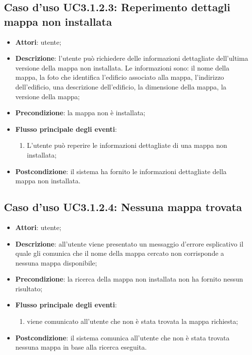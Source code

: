 \documentclass[../AnalisiDeiRequisiti.tex]{subfiles}
\begin{document}
\subsection{Caso d'uso UC3.1.2.3: Reperimento dettagli mappa non installata}
\begin{itemize}
	\item \textbf{Attori}: utente;
	\item \textbf{Descrizione}: l'utente può richiedere delle informazioni dettagliate dell'ultima versione della mappa non installata. Le informazioni sono: il nome della mappa, la foto che identifica l'edificio associato alla mappa, l'indirizzo dell'edificio, una descrizione dell'edificio, la dimensione della mappa, la versione della mappa; 
	\item \textbf{Precondizione}: la mappa non è installata;
	
	\item \textbf{Flusso principale degli eventi}:
	\begin{enumerate}
		\item L'utente può reperire le informazioni dettagliate di una mappa non installata;
		
	\end{enumerate}
	\item \textbf{Postcondizione}: il sistema ha fornito le informazioni dettagliate della mappa non installata.
\end{itemize}
\hypertarget{UC3.1.2.4}{}
\subsection{Caso d'uso UC3.1.2.4: Nessuna mappa trovata}
\begin{itemize}
	\item \textbf{Attori}: utente;
	\item \textbf{Descrizione}: all'utente viene presentato un messaggio d'errore esplicativo il quale gli comunica che il nome della mappa cercato non corrisponde a nessuna mappa disponibile; 
	\item \textbf{Precondizione}: la ricerca della mappa non installata non ha fornito nessun risultato;
	
	\item \textbf{Flusso principale degli eventi}:
	\begin{enumerate}
		\item viene comunicato all'utente che non è stata trovata la mappa richiesta;
		
	\end{enumerate}
	\item \textbf{Postcondizione}: il sistema comunica all'utente che non è stata trovata nessuna mappa in base alla ricerca eseguita.
\end{itemize}
\hypertarget{UC3.2}{}
\end{document}
